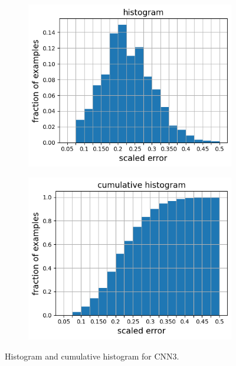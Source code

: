 \documentclass[12pt]{article}
\newcommand{\nhghalfwidth}{0.48\linewidth}
\newcommand{\nhgtotalheight}{4cm}
\begin{document}
\begin{figure}[!h]
\captionsetup[subfigure]{justification=centering}
  \centering
  \begin{subfigure}[c]{\nhghalfwidth}
    \centering
    \includegraphics[totalheight=\nhgtotalheight]{Figures/Results3/histogram.png}
  \end{subfigure}
%  
  \begin{subfigure}[c]{\nhghalfwidth}
      \centering
    \includegraphics[totalheight=\nhgtotalheight]{Figures/Results3/cumulative.png}
  \end{subfigure}
  \caption{\label{fig:cnn3histo} Histogram and cumulative histogram for CNN3.}
\end{figure}
%
\end{document}
